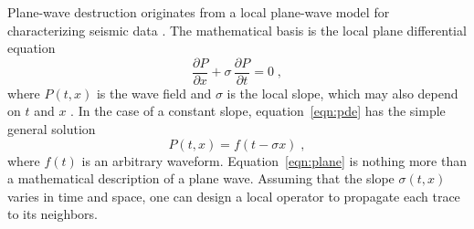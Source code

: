 Plane-wave destruction originates from a local plane-wave model for
characterizing seismic data \cite[]{GEO67-06-19461960}. The
mathematical basis is the local plane differential equation
\begin{equation}
  \frac{\partial P}{\partial x} + 
  \sigma\,\frac{\partial P}{\partial t} = 0\;,
  \label{eqn:pde}
\end{equation}
where $P(t,x)$ is the wave field and $\sigma$ is the local slope,
which may also depend on $t$ and $x$ \cite[]{pvi}. In the case of a
constant slope, equation~\ref{eqn:pde} has the simple general solution
\begin{equation}
  P(t,x) = f(t - \sigma x)\;,
  \label{eqn:plane}
\end{equation}
where $f(t)$ is an arbitrary waveform. Equation~\ref{eqn:plane} is
nothing more than a mathematical description of a plane wave. Assuming
that the slope $\sigma(t,x)$ varies in time and space, one can design
a local operator to propagate each trace to its neighbors.

